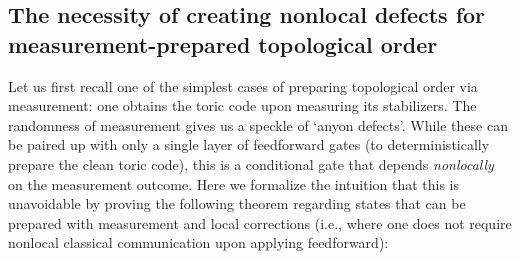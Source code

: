 \documentclass[nofootinbib,prx,twocolumn,showpacs,superscriptaddress,notitlepage,amsmath,amssymb]{revtex4-2}
\theoremstyle{definition}
\begin{document}
\subsection{The necessity of creating nonlocal defects for measurement-prepared topological order}

Let us first recall one of the simplest cases of preparing topological order via measurement: one obtains the toric code upon measuring its stabilizers. The randomness of measurement gives us a speckle of `anyon defects'. While these can be paired up with only a single layer of feedforward gates (to deterministically prepare the clean toric code), this is a conditional gate that depends \emph{nonlocally} on the measurement outcome. Here we formalize the intuition that this is unavoidable by proving the following theorem regarding states that can be prepared with measurement and local corrections (i.e., where one does not require nonlocal classical communication upon applying feedforward):
\end{document}
